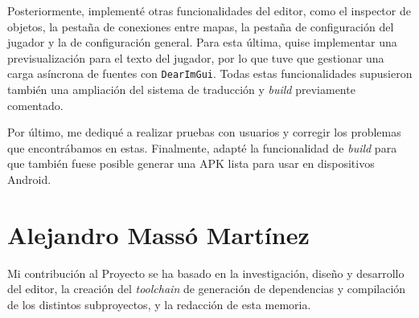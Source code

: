 Posteriormente, implementé otras funcionalidades del editor, como el inspector de objetos, la pestaña de conexiones entre mapas, la pestaña de configuración del jugador y la de configuración general. Para esta última, quise implementar una previsualización para el texto del jugador, por lo que tuve que gestionar una carga asíncrona de fuentes con \texttt{DearImGui}. Todas estas funcionalidades supusieron también una ampliación del sistema de traducción y \textit{build} previamente comentado.  

Por último, me dediqué a realizar pruebas con usuarios y corregir los problemas que encontrábamos en estas. Finalmente, adapté la funcionalidad de \textit{build} para que también fuese posible generar una APK lista para usar en dispositivos Android.

\section*{Alejandro Massó Martínez}
Mi contribución al Proyecto se ha basado en la investigación, diseño y desarrollo del editor, la creación del \textit{toolchain} de generación de dependencias y compilación de los distintos subproyectos, y la redacción de esta memoria.

\medskip

